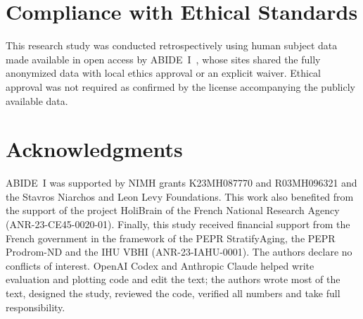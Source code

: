 \documentclass{article}
\begin{document}
\section{Compliance with Ethical Standards}
\label{sec:ethics}
This research study was conducted retrospectively using human subject data made available in open access by ABIDE~I~\cite{dimartino2014abide}, whose sites shared the fully anonymized data with local ethics approval or an explicit waiver. Ethical approval was not required as confirmed by the license accompanying the publicly available data.

\section{Acknowledgments}
\label{sec:acknowledgments}
ABIDE~I was supported by NIMH grants K23MH087770 and R03MH096321 and the Stavros Niarchos and Leon Levy Foundations. This work also benefited from the support of the project HoliBrain of the French National Research Agency (ANR-23-CE45-0020-01). Finally, this study received financial support from the French government in the framework of the PEPR StratifyAging, the PEPR Prodrom-ND and the IHU VBHI (ANR-23-IAHU-0001). The authors declare no conflicts of interest. OpenAI Codex and Anthropic Claude helped write evaluation and plotting code and edit the text; the authors wrote most of the text, designed the study, reviewed the code, verified all numbers and take full responsibility.

\let\oldthebibliography\thebibliography
\renewcommand{\thebibliography}[1]{\oldthebibliography{#1}%
  \setlength{\itemsep}{0pt}\setlength{\parskip}{0pt}\setlength{\parsep}{0pt}}
{\footnotesize

}
\end{document}
